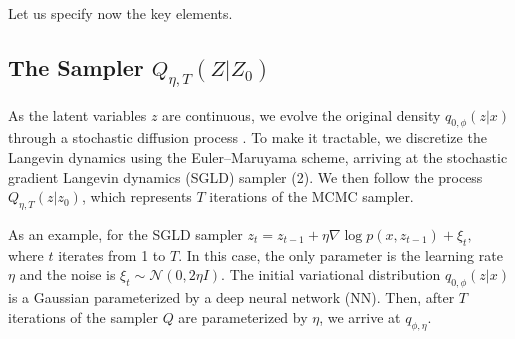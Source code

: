 Let us specify now the key elements.

\subsection*{The Sampler $Q_{ \eta, T}(Z|Z_0)$ } \label{sec:grad}

{ As the latent variables $z$ are continuous}, %
we evolve the original density $q_{0,\phi}(z|x)$ through a stochastic diffusion process \parencite{pavliotis2014stochastic}. To make it tractable, we discretize the Langevin dynamics using the Euler--Maruyama scheme, arriving at the stochastic gradient Langevin dynamics (SGLD) sampler (2). %
We then follow the process $Q_{\eta,T} (z | z_0)$,
which represents $T$ iterations of the MCMC sampler. 

As an example, for the SGLD sampler $z_t = z_{t-1} + \eta \nabla \log p(x, z_{t-1}) + \xi_{t},$ where $t$ iterates from 1 to $T$. In this case, the only parameter
is the learning rate $\eta$ and the noise is $\xi_t \sim \mathcal{N}(0, 2\eta I)$. %
The initial variational distribution $q_{0, \phi}(z|x)$ is a Gaussian parameterized by a deep neural network (NN). Then, after $T$ iterations of the sampler $Q$ are parameterized by $\eta$, we arrive at $q_{\phi, \eta}$. 

